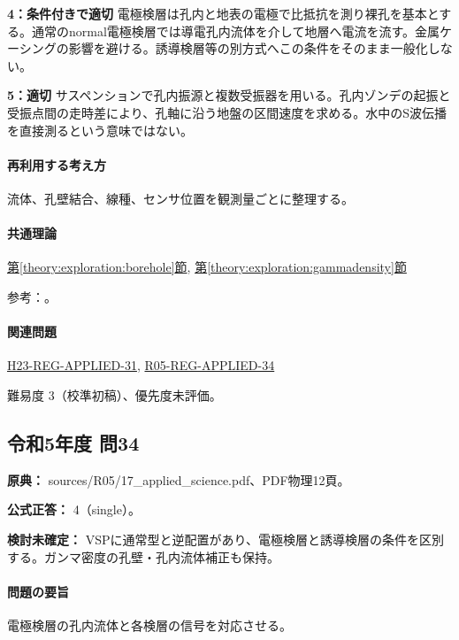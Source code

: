 \noindent\textbf{4：条件付きで適切} 電極検層は孔内と地表の電極で比抵抗を測り裸孔を基本とする。通常のnormal電極検層では導電孔内流体を介して地層へ電流を流す。金属ケーシングの影響を避ける。誘導検層等の別方式へこの条件をそのまま一般化しない。\par

\noindent\textbf{5：適切} サスペンションで孔内振源と複数受振器を用いる。孔内ゾンデの起振と受振点間の走時差により、孔軸に沿う地盤の区間速度を求める。水中のS波伝播を直接測るという意味ではない。\par

\paragraph{再利用する考え方} 流体、孔壁結合、線種、センサ位置を観測量ごとに整理する。

\paragraph{共通理論} \hyperref[theory:exploration:borehole]{第\ref*{theory:exploration:borehole}節}, \hyperref[theory:exploration:gammadensity]{第\ref*{theory:exploration:gammadensity}節}

\par 参考：\cite{epa_borehole_resistivity,epa_gamma_density,geebec_ps,oyo_suspension}。

\paragraph{関連問題} \hyperref[q:h23-reg-applied-31]{H23-REG-APPLIED-31}, \hyperref[q:r05-reg-applied-34]{R05-REG-APPLIED-34}

\par 難易度 3（校準初稿）、優先度未評価。

\subsection{令和5年度 問34}
\label{q:r05-reg-applied-34}

\noindent\textbf{原典：} sources/R05/17\_applied\_science.pdf、PDF物理12頁。

\textbf{公式正答：} 4（single）。

\par\textbf{検討未確定：} VSPに通常型と逆配置があり、電極検層と誘導検層の条件を区別する。ガンマ密度の孔壁・孔内流体補正も保持。

\paragraph{問題の要旨} 電極検層の孔内流体と各検層の信号を対応させる。

